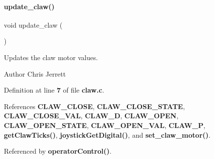 \paragraph{update\+\_\+claw()}
{\footnotesize\ttfamily void update\+\_\+claw (\begin{DoxyParamCaption}{ }\end{DoxyParamCaption})}



Updates the claw motor values. 

\begin{DoxyAuthor}{Author}
Chris Jerrett 
\end{DoxyAuthor}


Definition at line \textbf{ 7} of file \textbf{ claw.\+c}.



References \textbf{ C\+L\+A\+W\+\_\+\+C\+L\+O\+SE}, \textbf{ C\+L\+A\+W\+\_\+\+C\+L\+O\+S\+E\+\_\+\+S\+T\+A\+TE}, \textbf{ C\+L\+A\+W\+\_\+\+C\+L\+O\+S\+E\+\_\+\+V\+AL}, \textbf{ C\+L\+A\+W\+\_\+D}, \textbf{ C\+L\+A\+W\+\_\+\+O\+P\+EN}, \textbf{ C\+L\+A\+W\+\_\+\+O\+P\+E\+N\+\_\+\+S\+T\+A\+TE}, \textbf{ C\+L\+A\+W\+\_\+\+O\+P\+E\+N\+\_\+\+V\+AL}, \textbf{ C\+L\+A\+W\+\_\+P}, \textbf{ get\+Claw\+Ticks()}, \textbf{ joystick\+Get\+Digital()}, and \textbf{ set\+\_\+claw\+\_\+motor()}.



Referenced by \textbf{ operator\+Control()}.


